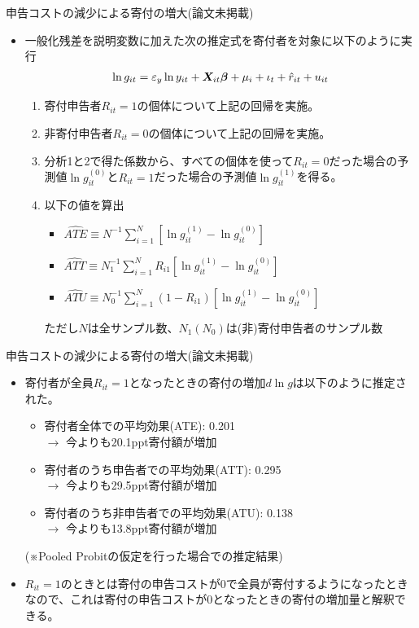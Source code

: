 \documentclass[dvipdfmx,10pt]{beamer}
\begin{document}
\begin{frame}{申告コストの減少による寄付の増大(論文未掲載)}
	\begin{itemize}
		\item 一般化残差を説明変数に加えた次の推定式を寄付者を対象に以下のように実行
		\begin{align}
			\ln g_{it} = \varepsilon_y \ln y_{it} + \bm{X}_{it}\bm{\beta} + \mu_i + \iota_t + \hat{r}_{it}+u_{it}\notag
		\end{align}
		\begin{enumerate}
			\item 寄付申告者$R_{it}=1$の個体について上記の回帰を実施。
			\item 非寄付申告者$R_{it}=0$の個体について上記の回帰を実施。
			\item 分析1と2で得た係数から、すべての個体を使って$R_{it}=0$だった場合の予測値$\ln g_{it}^{(0)}$と$R_{it}=1$だった場合の予測値$\ln g_{it}^{(1)}$を得る。
			\item 以下の値を算出
			\begin{itemize}
				\item $\hat{ATE}\equiv N^{-1}\sum_{i=1}^N[\ln g_{it}^{(1)}-\ln g_{it}^{(0)}]$
				\item $\hat{ATT}\equiv N_1^{-1}\sum_{i=1}^NR_{i1}[\ln g_{it}^{(1)}-\ln g_{it}^{(0)}]$
				\item $\hat{ATU}\equiv N_0^{-1}\sum_{i=1}^N(1-R_{i1})[\ln g_{it}^{(1)}-\ln g_{it}^{(0)}]$
			\end{itemize}
			ただし$N$は全サンプル数、$N_1(N_0)$は(非)寄付申告者のサンプル数
		\end{enumerate}
	\end{itemize}
\end{frame}

\begin{frame}{申告コストの減少による寄付の増大(論文未掲載)}
	\begin{itemize}
		\item 寄付者が全員$R_{it}=1$となったときの寄付の増加$d \ln g$は以下のように推定された。
		\begin{itemize}
			\item 寄付者全体での平均効果(ATE): 0.201\\
			$\to$ 今よりも20.1ppt寄付額が増加
			\item 寄付者のうち申告者での平均効果(ATT): 0.295\\
			$\to$ 今よりも29.5ppt寄付額が増加
			\item 寄付者のうち非申告者での平均効果(ATU): 0.138\\
			$\to$ 今よりも13.8ppt寄付額が増加
		\end{itemize}
		(※Pooled Probitの仮定を行った場合での推定結果)
		\item $R_{it}=1$のときとは寄付の申告コストが0で全員が寄付するようになったときなので、これは寄付の申告コストが0となったときの寄付の増加量と解釈できる。
	\end{itemize}
\end{frame}
\end{document}

